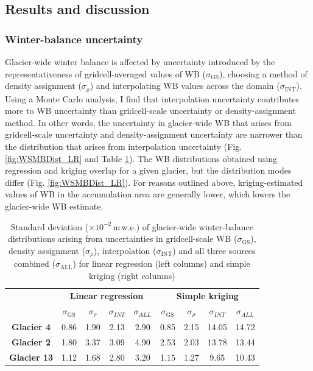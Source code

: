 \documentclass{sfuthesis}
\begin{document}
{\subsection{Results and discussion}
\label{sec:Unc_results}

\subsubsection{Winter-balance uncertainty}

Glacier-wide winter balance is affected by uncertainty introduced by the representativeness of gridcell-averaged values of WB ($\sigma_{\mathrm{GS}}$), choosing a method of density assignment ($\sigma_{\rho}$) and interpolating WB values across the domain ($\sigma_{\mathrm{INT}}$). Using a Monte Carlo analysis, I find that interpolation uncertainty contributes more to WB uncertainty than gridcell-scale uncertainty or density-assignment method. In other words, the uncertainty in glacier-wide WB that arises from gridcell-scale uncertainty and density-assignment uncertainty are narrower than the distribution that arises from interpolation uncertainty (Fig. \ref{fig:WSMBDist_LR} and Table \ref{tab:WSMBdistribution_sigma}). The WB distributions obtained using regression and kriging overlap for a given glacier, but the distribution modes differ (Fig. \ref{fig:WSMBDist_LR}). For reasons outlined above, kriging-estimated values of WB in the accumulation area are generally lower, which lowers the glacier-wide WB estimate. 

 \begin{table}
\centering
\caption[Standard deviation ($\times10^{-2}$\,m\,w.e.) of glacier-wide winter-balance distributions arising from uncertainties in gridcell-scale WB ($\sigma_{\mathrm{GS}}$), density assignment ($\sigma_{\rho}$), interpolation ($\sigma_{\mathrm{INT}}$) and all three sources combined ($\sigma_{\mathrm{ALL}}$) for linear regression and simple kriging]{Standard deviation ($\times10^{-2}$\,m\,w.e.) of glacier-wide winter-balance distributions arising from uncertainties in gridcell-scale WB ($\sigma_{\mathrm{GS}}$), density assignment ($\sigma_{\rho}$), interpolation ($\sigma_{\mathrm{INT}}$) and all three sources combined ($\sigma_{\mathrm{ALL}}$) for linear regression (left columns) and simple kriging (right columns)}
\label{tab:WSMBdistribution_sigma}
\begin{tabular}{c|cccc|cccc}
 & \multicolumn{4}{c|}{\textbf{Linear regression}} & \multicolumn{4}{c}{\textbf{Simple kriging}} \\
\textbf{} & $\sigma_{\mathrm{GS}}$ & $\sigma_{\rho}$ & $\sigma_{INT}$ & $\sigma_{ALL}$ & $\sigma_{\mathrm{GS}}$ & $\sigma_{\rho}$ & $\sigma_{INT}$ & $\sigma_{ALL}$ \\ \hline
\textbf{Glacier 4} & 0.86 & 1.90 & 2.13 & 2.90 & 0.85 & 2.15 & 14.05 & 14.72 \\
\textbf{Glacier 2} & 1.80 & 3.37 & 3.09 & 4.90 & 2.53 & 2.03 & 13.78 & 13.44 \\
\textbf{Glacier 13} & 1.12 & 1.68 & 2.80 & 3.20 & 1.15 & 1.27 & 9.65 & 10.43
\end{tabular}
\end{table}

}
\end{document}
